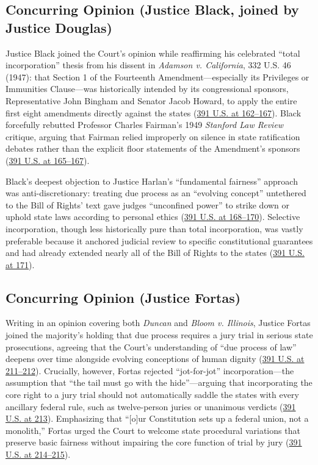 \documentclass[12pt]{article}
\begin{document}
\subsection{Concurring Opinion (Justice Black, joined by Justice Douglas)}

Justice Black joined the Court's opinion while reaffirming his celebrated ``total incorporation'' thesis from his dissent in \textit{Adamson v. California}, 332 U.S. 46 (1947): that Section 1 of the Fourteenth Amendment---especially its Privileges or Immunities Clause---was historically intended by its congressional sponsors, Representative John Bingham and Senator Jacob Howard, to apply the entire first eight amendments directly against the states (\href{https://supreme.justia.com/cases/federal/us/391/145/}{391 U.S. at 162--167}). Black forcefully rebutted Professor Charles Fairman's 1949 \textit{Stanford Law Review} critique, arguing that Fairman relied improperly on silence in state ratification debates rather than the explicit floor statements of the Amendment's sponsors (\href{https://supreme.justia.com/cases/federal/us/391/145/}{391 U.S. at 165--167}).

Black's deepest objection to Justice Harlan's ``fundamental fairness'' approach was anti-discretionary: treating due process as an ``evolving concept'' untethered to the Bill of Rights' text gave judges ``unconfined power'' to strike down or uphold state laws according to personal ethics (\href{https://supreme.justia.com/cases/federal/us/391/145/}{391 U.S. at 168--170}). Selective incorporation, though less historically pure than total incorporation, was vastly preferable because it anchored judicial review to specific constitutional guarantees and had already extended nearly all of the Bill of Rights to the states (\href{https://supreme.justia.com/cases/federal/us/391/145/}{391 U.S. at 171}).

\subsection{Concurring Opinion (Justice Fortas)}

Writing in an opinion covering both \textit{Duncan} and \textit{Bloom v. Illinois}, Justice Fortas joined the majority's holding that due process requires a jury trial in serious state prosecutions, agreeing that the Court's understanding of ``due process of law'' deepens over time alongside evolving conceptions of human dignity (\href{https://supreme.justia.com/cases/federal/us/391/194/}{391 U.S. at 211--212}). Crucially, however, Fortas rejected ``jot-for-jot'' incorporation---the assumption that ``the tail must go with the hide''---arguing that incorporating the core right to a jury trial should not automatically saddle the states with every ancillary federal rule, such as twelve-person juries or unanimous verdicts (\href{https://supreme.justia.com/cases/federal/us/391/194/}{391 U.S. at 213}). Emphasizing that ``[o]ur Constitution sets up a federal union, not a monolith,'' Fortas urged the Court to welcome state procedural variations that preserve basic fairness without impairing the core function of trial by jury (\href{https://supreme.justia.com/cases/federal/us/391/194/}{391 U.S. at 214--215}).
\end{document}
